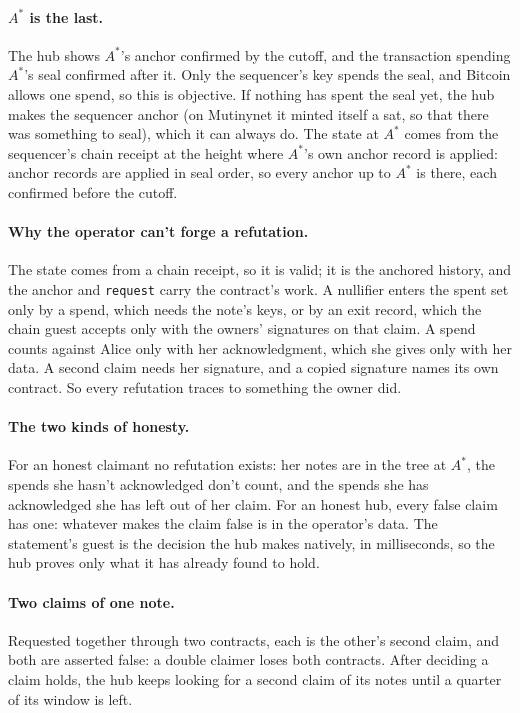 \documentclass[11pt]{article}
\newcommand{\Astar}{A^{*}}
\newcommand{\tx}[1]{\texttt{#1}}
\begin{document}
\paragraph{$\Astar$ is the last.} The hub shows $\Astar$'s anchor
confirmed by the cutoff, and the transaction spending $\Astar$'s seal
confirmed after it. Only the sequencer's key spends the seal, and Bitcoin
allows one spend, so this is objective. If nothing has spent the seal
yet, the hub makes the sequencer anchor (on Mutinynet it minted itself
a sat, so that there was something to seal), which it can always do. The
state at $\Astar$ comes from the sequencer's chain receipt at the
height where $\Astar$'s own anchor record is applied: anchor records are
applied in seal order, so every anchor up to $\Astar$ is there, each
confirmed before the cutoff.

\paragraph{Why the operator can't forge a refutation.} The state comes
from a chain receipt, so it is valid; it is the anchored history, and
the anchor and \tx{request} carry the contract's work. A nullifier
enters the spent set only by a spend, which needs the note's keys, or by
an exit record, which the chain guest accepts only with the owners'
signatures on that claim. A spend counts against Alice only with her
acknowledgment, which she gives only with her data. A second claim needs
her signature, and a copied signature names its own contract. So every
refutation traces to something the owner did.

\paragraph{The two kinds of honesty.} For an honest claimant no
refutation exists: her notes are in the tree at $\Astar$, the spends
she hasn't acknowledged don't count, and the spends she has
acknowledged she has left out of her claim. For an honest hub, every
false claim has one: whatever makes the claim false is in the
operator's data. The statement's guest is the decision the hub makes
natively, in milliseconds, so the hub proves only what it has already
found to hold.

\paragraph{Two claims of one note.} Requested together through two
contracts, each is the other's second claim, and both are asserted
false: a double claimer loses both contracts. After deciding a claim
holds, the hub keeps looking for a second claim of its notes until a
quarter of its window is left.
\end{document}

